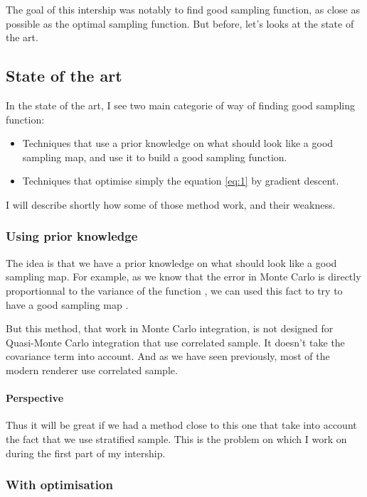\documentclass{classeENS}
\begin{document}
The goal of this intership was notably to find good sampling function, as close as 
possible as the optimal sampling function. But before, let's looks at the state of the art.

\subsection{State of the art}

In the state of the art, I see two main categorie of way of finding good sampling function:
\begin{itemize}
    \item Techniques that use a prior knowledge on what should look like a good sampling map, 
    and use it to build a good sampling function.
    \item Techniques that optimise simply the equation \ref{eq:1} by gradient descent.
\end{itemize}
I will describe shortly how some of those method work, and their weakness.

\subsubsection{Using prior knowledge}

\par The idea is that we have a prior knowledge on what should look like a good 
sampling map. For example, as we know that the error in Monte Carlo 
is directly proportionnal to the variance of the function \label{eq:variance},
we can used this fact to try to have a good sampling map \cite{10.1145/325165.325179}.

\par But this method, that work in Monte Carlo integration, is not designed for
Quasi-Monte Carlo integration that use correlated sample. It doesn't take the 
covariance term into account. 
And as we have seen previously, most of the modern renderer use correlated sample. 

\paragraph*{Perspective} Thus it will be great if we had a method close to this one that take into account
the fact that we use stratified sample. This is the problem on which I work on during the first
part of my intership.

\subsubsection{With optimisation}
\end{document}
